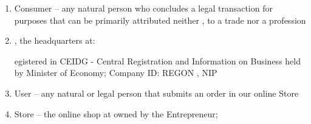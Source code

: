 

		\begin{enumerate}
			\item Consumer – any natural person who concludes a legal transaction for purposes that can be primarily attributed neither 
\shopname, to a trade nor a profession
			
			\item  \companyname, the headquarters at: \address
registered in CEIDG - Central Registration and Information on Business held by Minister of Economy; Company ID:  REGON \regon, NIP \nip
		
			\item User – any natural or legal person that submits an order in our online Store		
			
			\item Store – the online shop at \httpaddr owned by the Entrepreneur;
		\end{enumerate} 
